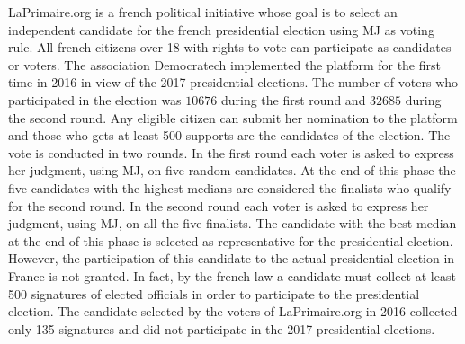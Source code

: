 LaPrimaire.org \citep{LaPrimaire} is a french political initiative whose goal is to select an independent candidate for the french presidential election using \ac{MJ} as voting rule. All french citizens over 18 with rights to vote can participate as candidates or voters. The association Democratech implemented the platform for the first time in 2016 in view of the 2017 presidential elections. The number of voters who participated in the election was $10676$ during the first round and $32685$ during the second round.
Any eligible citizen can submit her nomination to the platform and those who gets at least 500 supports are the candidates of the election. The vote is conducted in two rounds.
In the first round each voter is asked to express her judgment, using \ac{MJ}, on five random candidates. At the end of this phase the five candidates with the highest medians are considered the finalists who qualify for the second round. In the second round each voter is asked to express her judgment, using \ac{MJ}, on all the five finalists. The candidate with the best median at the end of this phase is selected as representative for the presidential election.
However, the participation of this candidate to the actual presidential election in France is not granted. In fact, by the french law a candidate must collect at least 500 signatures of elected officials in order to participate to the presidential election. The candidate selected by the voters of LaPrimaire.org in 2016 collected only 135 signatures and did not participate in the 2017 presidential elections.  
